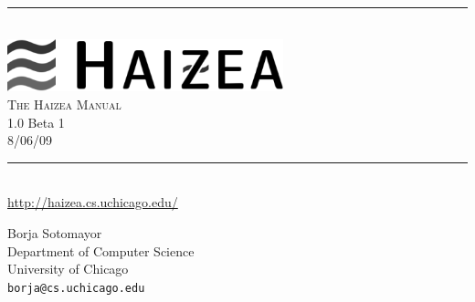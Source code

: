 \newcommand{\HRule}{\rule{\linewidth}{0.5mm}}

\begin{titlepage}
 
\begin{center}
 
\HRule \\[0.4cm]
\includegraphics[width=0.6\textwidth]{images/haizea.png}\\[1cm]
\textsc{ \huge The Haizea Manual}\\{\large 1.0 Beta 1}\\{\large 8/06/09}\\[0.4cm]
 
\HRule \\[1.5cm]
\url{http://haizea.cs.uchicago.edu/}

\vfill
 
\begin{flushright} \large
Borja Sotomayor\\
Department of Computer Science\\
University of Chicago\\
\texttt{borja@cs.uchicago.edu}
\end{flushright}
 
\end{center}
 
\end{titlepage}

